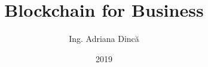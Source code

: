 \title{Blockchain for Business}
\author{Ing. Adriana Dincă}
\date{2019}



\newcommand{\project}{Hardware Supply-Chain}

